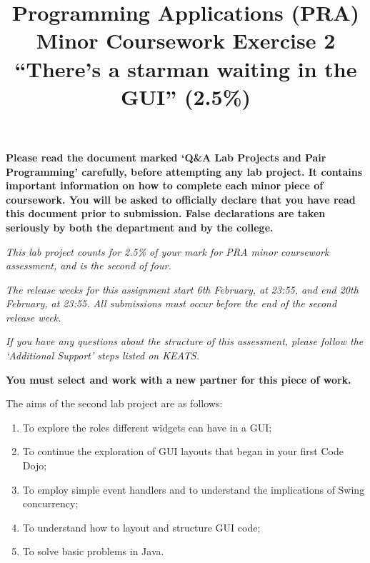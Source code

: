\documentclass[11pt]{article}
\title{Programming Applications (PRA) \\ Minor Coursework Exercise 2 \\
``There's a starman waiting in the GUI'' (2.5\%)}
\date{}                                           %
\begin{document}
\maketitle

\vspace{-10mm}

\textbf{Please read the document marked `Q\&A Lab Projects and Pair Programming' carefully, before attempting any lab project. It contains important information on how to complete each minor piece of coursework. You will be asked to officially declare that you have read this document prior to submission. False declarations are taken seriously by both the department and by the college.}

\emph{This lab project counts for 2.5\% of your mark for PRA minor coursework assessment, and is the second of four.}

\emph{The release weeks for this assignment start 6th February, at 23:55, and end 20th February, at 23:55. All submissions must occur before the end of the second release week.}

\emph{If you have any questions about the structure of this assessment, please follow the `Additional Support' steps listed on KEATS.}

\textbf{You must select and work with a new partner for this piece of work.}

The aims of the second lab project are as follows:

\begin{enumerate}
	
	\item To explore the roles different widgets can have in a GUI;
	\item To continue the exploration of GUI layouts that began in your first Code Dojo;
	\item To employ simple event handlers and to understand the implications of Swing concurrency;
	\item To understand how to layout and structure GUI code;
	\item To solve basic problems in Java.

\end{enumerate}
\end{document}
